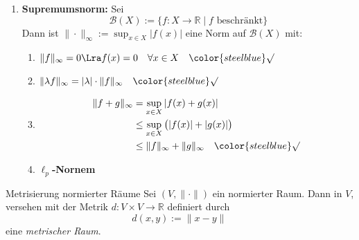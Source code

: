 \begin{beispielbox}
\begin{enumerate}
        \item \textbf{Supremumsnorm:} Sei
        $$
        \mathcal{B}(X) := \{ f : X \to \mathbb{R} \mid f \text{ beschränkt} \}
        $$
        Dann ist $\|\cdot\|_\infty := \sup_{x \in X} |f(x)|$ eine Norm auf $\mathcal{B}(X)$ mit:
        \begin{enumerate}
            \item[(N1)] $\|f\|_\infty = 0 \Lra f(x) = 0 \quad \forall x \in X \quad \color{steelblue}\surd$
            \item[(N2)] $\| \lambda f \|_\infty = |\lambda| \cdot \|f\|_\infty \quad \color{steelblue}\surd$
            \item[(N3)] 
                \begin{align*}
                    \|f+g\|_\infty &= \sup_{x \in X} |f(x) + g(x)| \\
                    &\le \sup_{x \in X} \big(|f(x)| + |g(x)|\big) \\
                    &\le \|f\|_\infty + \|g\|_\infty \quad \color{steelblue}\surd
                \end{align*}

        \item \textbf{$\ell_p$-Nornem}
        \end{enumerate}
    \end{enumerate}
\end{beispielbox}


\begin{lemma}{Metrisierung normierter Räume}
    Sei $(V,\|\cdot\|)$ ein normierter Raum. Dann in $V$, versehen mit der Metrik $d : V \times V \rightarrow \mathbb{R}$ definiert durch
    $$
        d(x,y) := \|x-y\| \,
    $$
    eine \emph{metrischer Raum}.
\end{lemma}

